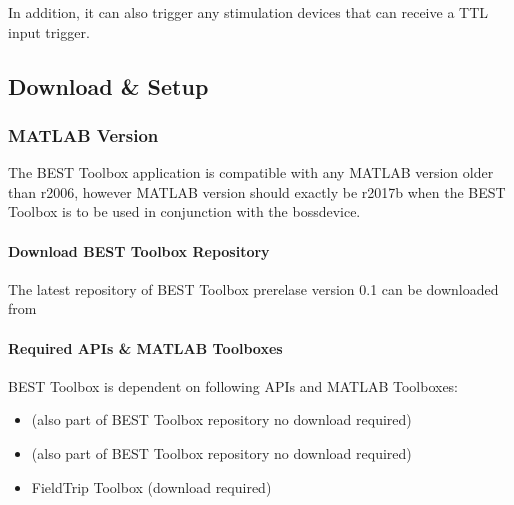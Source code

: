 \documentclass[letterpaper,10pt,english]{sphinxmanual}
\begin{document}
\sphinxAtStartPar
In addition, it can also trigger any stimulation devices that can receive a TTL input trigger.


\subsection{Download \& Setup}
\label{\detokenize{2_DownloadAndSetup:download-setup}}\label{\detokenize{2_DownloadAndSetup::doc}}

\subsubsection{MATLAB Version}
\label{\detokenize{2_DownloadAndSetup:matlab-version}}
\sphinxAtStartPar
The BEST Toolbox application is compatible with any MATLAB version older than r2006, however MATLAB version should exactly be r2017b when the BEST Toolbox is to be used in conjunction with the bossdevice.


\paragraph{Download BEST Toolbox Repository}
\label{\detokenize{2_DownloadAndSetup:download-best-toolbox-repository}}
\sphinxAtStartPar
The latest repository of BEST Toolbox prerelase version 0.1 can be downloaded from 


\paragraph{Required APIs \& MATLAB Toolboxes}
\label{\detokenize{2_DownloadAndSetup:required-apis-matlab-toolboxes}}
\sphinxAtStartPar
BEST Toolbox is dependent on following APIs and MATLAB Toolboxes:
\begin{itemize}
\item {} 
\sphinxAtStartPar
{}  (also part of BEST Toolbox repository \textendash{} no download required)

\item {} 
\sphinxAtStartPar
{}  (also part of BEST Toolbox repository \textendash{} no download required)

\item {} 
\sphinxAtStartPar
FieldTrip Toolbox (download required)

\end{itemize}
\end{document}
